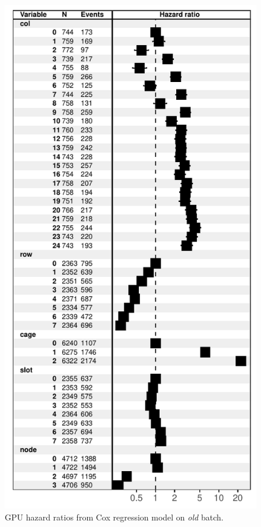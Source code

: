 \begin{figure}
  \centering
  \includegraphics[width=\columnwidth]{figs/cox_o001.pdf}
  \caption{GPU hazard ratios from Cox regression model on {\em old}
    batch.}
  \label{fig:cox-old}
\end{figure}
